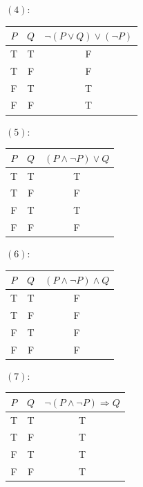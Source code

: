 \begin{solution}
    $(4)$:
    \begin{table}[H]
        \centering
        \begin{tabular}{ccc}
            \toprule
            $P$ & $Q$ & $\neg(P\lor Q)\lor(\neg P)$\\
            \midrule
            T & T & F\\
            T & F & F\\
            F & T & T\\
            F & F & T\\
            \bottomrule
        \end{tabular}
    \end{table}

    $(5)$:
        \begin{table}[H]
        \centering
        \begin{tabular}{ccc}
            \toprule
            $P$ & $Q$ & $(P\land\neg P)\lor Q$\\
            \midrule
            T & T & T\\
            T & F & F\\
            F & T & T\\
            F & F & F\\
            \bottomrule
        \end{tabular}
    \end{table}

    $(6)$: 
        \begin{table}[H]
        \centering
        \begin{tabular}{ccc}
            \toprule
            $P$ & $Q$ & $(P\land \neg P)\land Q$\\
            \midrule
            T & T & F\\
            T & F & F\\
            F & T & F\\
            F & F & F\\
            \bottomrule
        \end{tabular}
    \end{table}

    $(7)$:
        \begin{table}[H]
        \centering
        \begin{tabular}{ccc}
            \toprule
            $P$ & $Q$ & $\neg(P\land \neg P)\Rightarrow Q$\\
            \midrule
            T & T & T\\
            T & F & T\\
            F & T & T\\
            F & F & T\\
            \bottomrule
        \end{tabular}
    \end{table}


\end{solution}
